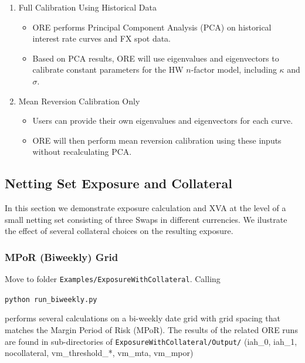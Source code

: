 \begin{enumerate}
    \item Full Calibration Using Historical Data
    \begin{itemize}
        \item ORE performs Principal Component Analysis (PCA) on historical interest rate curves and FX spot data.
        \item Based on PCA results, ORE will use eigenvalues and eigenvectors to calibrate constant parameters for the HW $n$-factor model, including $\kappa$ and $\sigma$.
    \end{itemize}

    \item Mean Reversion Calibration Only
    \begin{itemize}
        \item Users can provide their own eigenvalues and eigenvectors for each curve.
        \item ORE will then perform mean reversion calibration using these inputs without recalculating PCA.
    \end{itemize}
\end{enumerate}


\subsection{Netting Set Exposure and Collateral}\label{example:exposurewithcollateral}

In this section we demonstrate exposure calculation and XVA at the level of a small netting set
consisting of three Swaps in different currencies. We ilustrate the effect of several collateral choices
on the resulting exposure.

\subsubsection{MPoR (Biweekly) Grid}

Move to folder {\tt Examples/ExposureWithCollateral}. Calling

\medskip
\centerline{\tt python run\_biweekly.py }
\medskip

performs several calculations on a bi-weekly date grid with grid spacing that matches the Margin Period of Risk (MPoR).
The results of the related ORE runs are found in sub-directories of {\tt ExposureWithCollateral/Output/} (iah\_0, iah\_1,
nocollateral, vm\_threshold\_*, vm\_mta, vm\_mpor)


